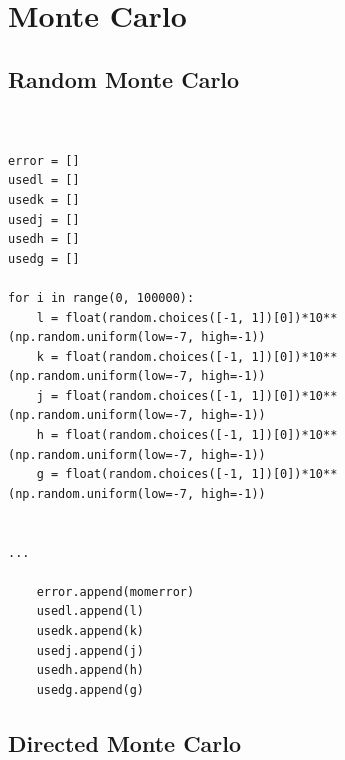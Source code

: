 \documentclass[openany]{article}
\begin{document}
\newpage

\newpage


\newpage

\printbibliography




\newpage
\appendix

\section{Monte Carlo}

\subsection{Random Monte Carlo}

\begin{verbatim}


error = []
usedl = []
usedk = []
usedj = []
usedh = []
usedg = []

for i in range(0, 100000):
    l = float(random.choices([-1, 1])[0])*10**(np.random.uniform(low=-7, high=-1))
    k = float(random.choices([-1, 1])[0])*10**(np.random.uniform(low=-7, high=-1))
    j = float(random.choices([-1, 1])[0])*10**(np.random.uniform(low=-7, high=-1))
    h = float(random.choices([-1, 1])[0])*10**(np.random.uniform(low=-7, high=-1))
    g = float(random.choices([-1, 1])[0])*10**(np.random.uniform(low=-7, high=-1))


...

    error.append(momerror)
    usedl.append(l)
    usedk.append(k)
    usedj.append(j)
    usedh.append(h)
    usedg.append(g)

\end{verbatim}

\subsection{Directed Monte Carlo}
\end{document}

